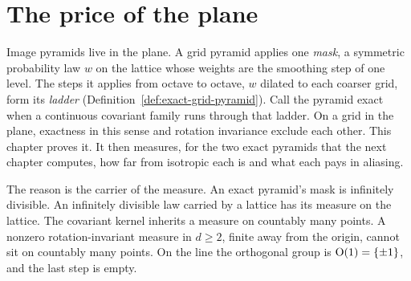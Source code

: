 %
%

\chapter{The price of the plane}
\label{ch:price}

Image pyramids live in the plane. A grid pyramid applies one \emph{mask}, a symmetric probability
law $w$ on the lattice whose weights are the smoothing step of one level. The steps it applies from
octave to octave, $w$ dilated to each coarser grid, form its \emph{ladder}
(Definition~\ref{def:exact-grid-pyramid}). Call the pyramid exact when a continuous covariant
family runs through that ladder. On a grid in the plane, exactness in this sense and rotation
invariance exclude each other. This chapter proves it. It then measures, for the two exact
pyramids that the next chapter computes, how far from isotropic each is and what each pays in
aliasing.

The reason is the carrier of the \Levy{} measure. An exact pyramid's mask is infinitely divisible.
An infinitely divisible law carried by a lattice has its \Levy{} measure on the lattice. The
covariant kernel inherits a \Levy{} measure on countably many points. A nonzero rotation-invariant
\Levy{} measure in $d \ge 2$, finite away from the origin, cannot sit on countably many points. On
the line the orthogonal group is $\mathrm{O}(1) = \{\pm 1\}$, and the last step is empty.

